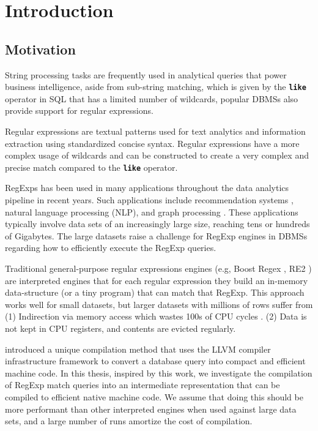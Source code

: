 
\chapter{Introduction}\label{chapter:introduction}

\section{Motivation}
String processing tasks are frequently used in analytical queries that power business intelligence, aside from sub-string matching, which is given by the \texttt{\textbf{like}} operator in SQL that has a limited number of wildcards, popular DBMSs also provide support for regular expressions.

Regular expressions are textual patterns used for text analytics and information extraction using standardized concise syntax. Regular expressions have a more complex usage of wildcards and can be constructed to create a very complex and precise match compared to the \texttt{\textbf{like}} operator.

RegExps has been used in many applications throughout the data analytics pipeline in recent years. Such applications include recommendation systems \cite{recsys1}, natural language processing (NLP), \cite{nlp1, nlp2} and graph processing \cite{graph1}. These applications typically involve data sets of an increasingly large size, reaching tens or hundreds of Gigabytes. The large datasets raise a challenge for RegExp engines in DBMSs regarding how to efficiently execute the RegExp queries.

Traditional general-purpose regular expressions engines (e.g, Boost Regex \cite{Boost}, RE2 \cite{re2}) are interpreted engines that for each regular expression they build an in-memory data-structure (or a tiny program) that can match that RegExp. This approach works well for small datasets, but larger datasets with millions of rows suffer from (1) Indirection via memory access which wastes 100s of CPU cycles \cite{cpumemgap}. (2) Data is not kept in CPU registers, and contents are evicted regularly.

\citet{querycomp} introduced a unique compilation method that uses the LLVM \cite{llvm} compiler infrastructure framework to convert a database query into compact and efficient machine code. In this thesis, inspired by this work, we investigate the compilation of RegExp match queries into an intermediate representation that can be compiled to efficient native machine code. We assume that doing this should be more performant than other interpreted engines when used against large data sets, and a large number of runs amortize the cost of compilation.

